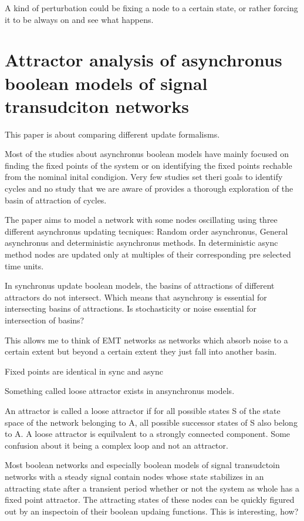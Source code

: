 \documentclass{article}
\begin{document}
A kind of perturbation could be fixing a node to a certain state, or rather forcing it to be always on and see what happens. 


\section{Attractor analysis of asynchronus boolean models of signal transudciton networks}


This paper is about comparing different update formalisms. 

Most of the studies about asynchronus boolean models have mainly focused on finding the fixed points of the system or on identifying the fixed points rechable from the nominal inital condigion. Very few studies set theri goals to identify cycles and no study that we are aware of provides a thorough exploration of the basin of attraction of cycles.



The paper aims to model a network with some nodes oscillating using three different asynchronus updating tecniques: Random order asynchronus, General asynchronus and deterministic asynchronus methods. In deterministic async method nodes are updated only at multiples of their corresponding pre selected time units. 


In synchronus update boolean models, the basins of attractions of different attractors do not intersect. Which means that asynchrony is essential for intersecting basins of attractions. Is stochasticity or noise essential for intersection of basins? 

This allows me to think of EMT networks as networks which absorb noise to a certain extent but beyond a certain extent they just fall into another basin. 

Fixed points are identical in sync and async 

Something called loose attractor exists in ansynchronus models. 

An attractor is called a loose attractor if for all possible states S of the state space of the network belonging to A, all possible successor states of S also belong to A. A loose attractor is equilvalent to a strongly connected component. Some confusion about it being a complex loop and not an attractor. 



Most boolean networks and especially boolean models of signal transudctoin networks with a steady signal contain nodes whose state stabilizes in an attracting state after a transient period whether or not the system as whole has a fixed point attractor. The attracting states of these nodes can be quickly figured out by an inspectoin of their boolean updaing functions. This is interesting, how?
\end{document}
